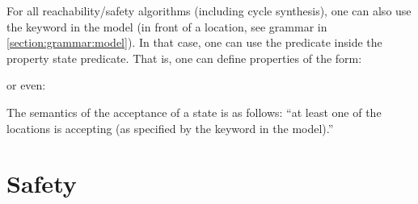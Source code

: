 \begin{remark}\label{remark:accepting}
	For all reachability/safety algorithms (including cycle synthesis), one can also use the  keyword in the model (in front of a location, see grammar in \cref{section:grammar:model}).
	In that case, one can use the  predicate inside the property state predicate.
	That is, one can define properties of the form:


	or even:


	The semantics of the acceptance of a state is as follows: ``at least one of the locations is accepting (as specified by the  keyword in the model).''

%
\end{remark}

%
%
%
%



\section{Safety}\label{ss:mode:EF}

